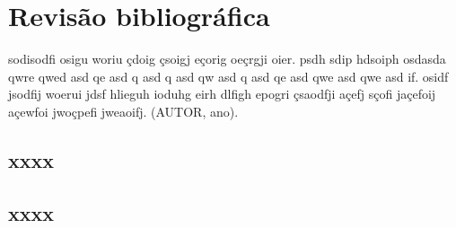 \chapter{Revisão bibliográfica}



\begin{citacao}
sodisodfi osigu woriu çdoig çsoigj eçorig oeçrgji oier.  psdh sdip hdsoiph osdasda qwre qwed asd qe asd q asd q asd qw asd q asd qe asd qwe asd qwe asd if. osidf jsodfij woerui jdsf hlieguh ioduhg eirh dlfigh epogri çsaodfji açefj sçofi jaçefoij açewfoi jwoçpefi jweaoifj. (AUTOR, ano).
\end{citacao}


\section{xxxx}


\section{xxxx}

